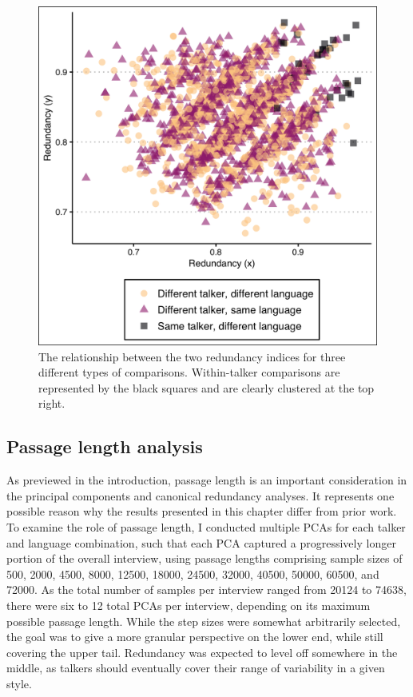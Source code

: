 \begin{figure}[htbp]
\begin{center}
\includegraphics[width=0.9\linewidth]{figures/ch3_redundancy.png} 
\caption{The relationship between the two redundancy indices for three different types of comparisons. Within-talker comparisons are represented by the black squares and are clearly clustered at the top right.}
\label{ch3:fig:redundancy}
\end{center}
\end{figure}

\subsection{Passage length analysis}\label{ch3:sec:passagelength}

As previewed in the introduction, passage length is an important consideration in the principal components and canonical redundancy analyses. It represents one possible reason why the results presented in this chapter differ from prior work. To examine the role of passage length, I conducted multiple PCAs for each talker and language combination, such that each PCA captured a progressively longer portion of the overall interview, using passage lengths comprising sample sizes of 500, 2000, 4500, 8000, 12500, 18000, 24500, 32000, 40500, 50000, 60500, and 72000. As the total number of samples per interview ranged from 20124 to 74638, there were six to 12 total PCAs per interview, depending on its maximum possible passage length. While the step sizes were somewhat arbitrarily selected, the goal was to give a more granular perspective on the lower end, while still covering the upper tail. Redundancy was expected to level off somewhere in the middle, as talkers should eventually cover their range of variability in a given style.

